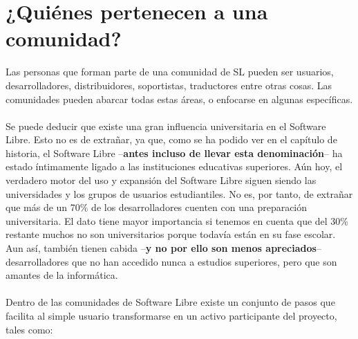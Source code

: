 \section{¿Quiénes pertenecen a una comunidad?}

Las personas que forman parte de una comunidad de SL pueden ser usuarios, desarrolladores, distribuidores, soportistas, traductores entre otras cosas. Las comunidades pueden abarcar todas estas áreas, o enfocarse en algunas específicas.
\\
\\
Se puede deducir que existe una gran influencia universitaria en el Software Libre. Esto no es de extrañar, ya que, como se ha podido ver en el capítulo de historia, el Software Libre –{\bf antes incluso de llevar esta denominación}– ha estado íntimamente ligado a las instituciones educativas superiores. Aún hoy, el verdadero motor del uso y expansión del Software Libre siguen siendo las universidades y los grupos de usuarios estudiantiles. No es, por tanto, de extrañar que más de un 70\% de los desarrolladores cuenten con una preparación universitaria. El dato tiene mayor importancia si tenemos en cuenta que del 30\% restante muchos no son universitarios porque todavía están en su fase escolar. Aun así, también tienen cabida –{\bf y no por ello son menos apreciados}– desarrolladores que no han accedido nunca a estudios superiores, pero que son amantes de la informática.
\\
\\
Dentro de las comunidades de Software Libre existe un conjunto de pasos que facilita al simple usuario transformarse en un activo participante del proyecto, tales como: 

